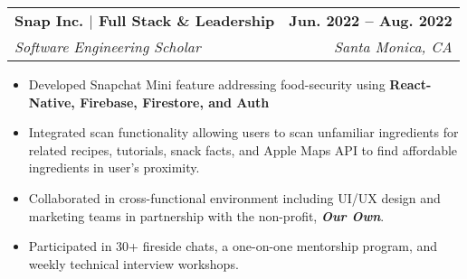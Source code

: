 \documentclass[letterpaper,11pt]{article}
\makeatletter
\newcommand{\resumeItem}[1]{
  \item\small{
    {#1 \vspace{-2pt}}
  }
}
\newcommand{\resumeSubheading}[4]{
  \vspace{-2pt}\item
    \begin{tabular*}{1.0\textwidth}[t]{l@{\extracolsep{\fill}}r}
      \textbf{#1} & \textbf{\small #2} \\
      \textit{\small#3} & \textit{\small #4} \\
    \end{tabular*}\vspace{-7pt}
}
\newcommand{\resumeItemListStart}{\begin{itemize}}
\newcommand{\resumeItemListEnd}{\end{itemize}\vspace{-5pt}}
\makeatother
\begin{document}
\resumeSubheading
{Snap Inc. $|$ Full Stack \& Leadership}{ Jun. 2022 -- Aug. 2022}
{Software Engineering Scholar}{Santa Monica, CA}
\resumeItemListStart
\resumeItem {
Developed Snapchat Mini feature addressing food-security using \textbf{React-Native, Firebase, Firestore, and Auth}}
\resumeItem{ Integrated scan functionality allowing users to scan unfamiliar ingredients for related recipes, tutorials, snack facts, and Apple Maps API to find affordable ingredients in user's proximity.}
\resumeItem{
Collaborated in cross-functional environment including UI/UX design and marketing teams in partnership with the non-profit, \textbf{\textit{Our Own}}. }
\resumeItem{ Participated in 30+ fireside chats, a one-on-one mentorship program, and weekly technical interview workshops.}
\resumeItemListEnd






\end{document}

